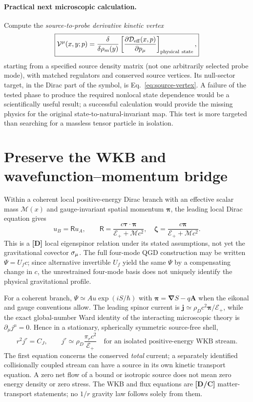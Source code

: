\documentclass[11pt,a4paper]{article}
\begin{document}
\paragraph{Practical next microscopic calculation.}
Compute the \emph{source-to-probe derivative kinetic vertex}
\begin{equation}\label{eq:actual-target}
 \boxed{\mathcal V^{\mu}(x,y;p)
 =\frac{\delta}{\delta\rho_m(y)}
 \left[\frac{\partial\mathcal D_{\rm eff}(x,p)}{\partial p_\mu}\right]_{\rm physical\ state},}
\end{equation}
starting from a specified source density matrix (not one arbitrarily selected probe mode), with matched regulators and conserved source vertices. Its null-sector target, in the Dirac part of the symbol, is Eq.~\eqref{eq:source-vertex}. A failure of the tested phase to produce the required nonlocal state dependence would be a scientifically useful result; a successful calculation would provide the missing physics for the original state-to-natural-invariant map. This test is more targeted than searching for a massless tensor particle in isolation.


\section{Preserve the WKB and wavefunction--momentum bridge}
Within a coherent local positive-energy Dirac branch with an effective scalar mass $\mathcal M(x)$ and gauge-invariant spatial momentum $\bm\pi$, the leading local Dirac equation gives
\begin{equation}\label{eq:spinor}
\boxed{u_B=\mathsf R u_A,\qquad \mathsf R=\frac{c\bm\tau\cdot\bm\pi}{\mathcal E_++\mathcal Mc^2},\quad \bm\zeta=\frac{c\bm\pi}{\mathcal E_++\mathcal Mc^2}.}
\end{equation}
This is a \textbf{[D]} local eigenspinor relation under its stated assumptions, not yet the gravitational covector $\sigma_\mu$. The full four-mode QGD construction may be written $\Psi=U_fc$; since alternative invertible $U_f$ yield the same $\Psi$ by a compensating change in $c$, the unrestrained four-mode basis does not uniquely identify the physical gravitational profile.

For a coherent branch, $\Psi\simeq Au\exp(iS/\hbar)$ with $\bm\pi=\bm\nabla S-q\bm A$ when the eikonal and gauge conventions allow. The leading spinor current is $\bm j\simeq\rho_D c^2\bm\pi/\mathcal E_+$, while the exact global-number Ward identity of the interacting microscopic theory is $\partial_\mu j^\mu=0$. Hence in a stationary, spherically symmetric source-free shell,
\begin{equation}\label{eq:bridge}
\boxed{r^2j^r=C_J,\qquad j^r\simeq\rho_D\frac{\pi_rc^2}{\mathcal E_+}\quad\text{for an isolated positive-energy WKB stream}.}
\end{equation}
The first equation concerns the conserved \emph{total} current; a separately identified collisionally coupled stream can have a source in its own kinetic transport equation. A zero net flow of a bound or isotropic source does not mean zero energy density or zero stress. The WKB and flux equations are \textbf{[D/C]} matter-transport statements; no $1/r$ gravity law follows solely from them.
\end{document}
